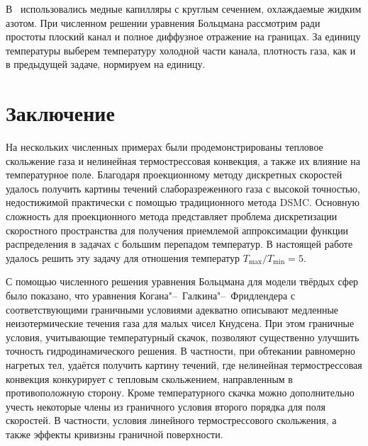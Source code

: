 \documentclass[
aps,%
12pt,%
final,%
notitlepage,%
oneside,%
onecolumn,%
nobibnotes,%
nofootinbib,%
superscriptaddress,%
noshowpacs,%
showkeys,%
centertags]%
{revtex4}
\begin{document}
В~\cite{Friedlander2003} использовались медные капилляры с круглым сечением,
охлаждаемые жидким азотом. При численном решении уравнения Больцмана рассмотрим
ради простоты плоский канал и полное диффузное отражение на границах.
За единицу температуры выберем температуру холодной части канала,
плотность газа, как и в предыдущей задаче, нормируем на единицу.

\section{Заключение}

На нескольких численных примерах были продемонстрированы тепловое скольжение газа
и нелинейная термострессовая конвекция, а также их влияние на температурное поле.
Благодаря проекционному методу дискретных скоростей удалось получить картины течений
слаборазреженного газа с высокой точностью, недостижимой практически с помощью традиционного метода DSMC.
Основную сложность для проекционного метода представляет проблема дискретизации скоростного пространства
для получения приемлемой аппроксимации функции распределения в задачах с большим перепадом температур.
В настоящей работе удалось решить эту задачу для отношения температур \(T_{\max}/T_{\min}=5\).

С помощью численного решения уравнения Больцмана для модели твёрдых сфер было показано,
что уравнения Когана"--~Галкина"--~Фридлендера с соответствующими граничными условиями адекватно описывают
медленные неизотермические течения газа для малых чисел Кнудсена.
При этом граничные условия, учитывающие температурный скачок, позволяют
существенно улучшить точность гидродинамического решения.
В частности, при обтекании равномерно нагретых тел, удаётся получить картину течений,
где нелинейная термострессовая конвекция конкурирует с тепловым скольжением,
направленным в противоположную сторону.
Кроме температурного скачка можно дополнительно учесть некоторые члены из граничного условия
второго порядка для поля скоростей. В частности, условия линейного термострессового скольжения,
а также эффекты кривизны граничной поверхности.




\end{document}
